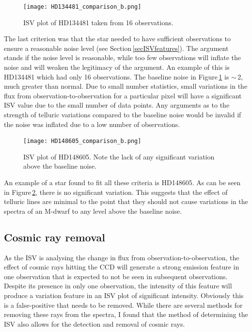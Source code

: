 \begin{figure}
	\centering
	\captionsetup{width=.8\textwidth}
    \texttt{[image: HD134481\_comparison\_b.png]}
    \caption{ISV plot of HD134481 taken from 16 observations.}
    \label{figHD134481_noise}
\end{figure}

The last criterion was that the star needed to have sufficient observations to ensure a reasonable noise level (see Section\,\ref{secISVfeatures}). The argument stands if the noise level is reasonable, while too few observations will inflate the noise and will weaken the legitimacy of the argument. An example of this is HD134481 which had only 16 observations. The baseline noise in Figure\,\ref{figHD134481_noise} is $\sim$\,2, much greater than normal. Due to small number statistics, small variations in the flux from observation-to-observation for a particular pixel will have a significant ISV value due to the small number of data points. Any arguments as to the strength of telluric variations compared to the baseline noise would be invalid if the noise was inflated due to a low number of observations.\\

\begin{figure}
	\centering
	\captionsetup{width=.8\textwidth}
    \texttt{[image: HD148605\_comparison\_b.png]}
    \caption{ISV plot of HD148605. Note the lack of any significant variation above the baseline noise.}
    \label{figHD148605}
\end{figure}

An example of a star found to fit all these criteria is HD148605. As can be seen in Figure\,\ref{figHD148605}, there is no significant variation. This suggests that the effect of telluric lines are minimal to the point that they should not cause variations in the spectra of an M-dwarf to any level above the baseline noise.

\subsection{Cosmic ray removal}
\label{secCosmic}
As the ISV is analysing the change in flux from observation-to-observation, the effect of cosmic rays hitting the CCD will generate a strong emission feature in one observation that is expected to not be seen in subsequent observations. Despite its presence in only one observation, the intensity of this feature will produce a variation feature in an ISV plot of significant intensity. Obviously this is a false-positive that needs to be removed. While there are several methods for removing these rays from the spectra, I found that the method of determining the ISV also allows for the detection and removal of cosmic rays.\\


